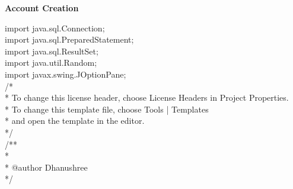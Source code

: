 \pagestyle{fancy}
\vspace{0.2in}
\rightarrow 
\begin{large}
\textbf{Account Creation}\\[0.2in]
\end{large}
import java.sql.Connection;\\
import java.sql.PreparedStatement;\\
import java.sql.ResultSet;\\
import java.util.Random;\\
import javax.swing.JOptionPane;\\
/*\\
* To change this license header, choose License Headers in Project Properties.\\
* To change this template file, choose Tools | Templates\\
* and open the template in the editor.\\
*/\\
/**\\
*\\
* @author Dhanushree\\
*/\\
